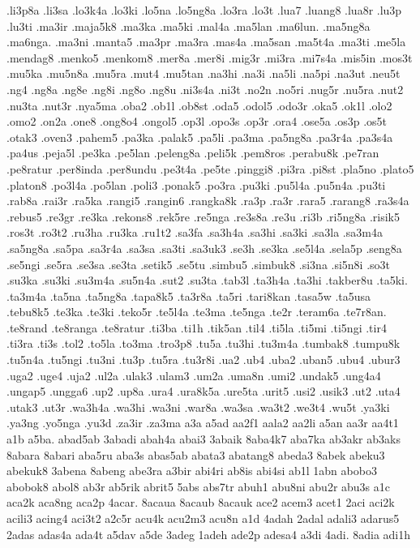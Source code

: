 {.li3p8a .li3sa .lo3k4a .lo3ki .lo5na .lo5ng8a .lo3ra .lo3t .lua7 .luang8
.lua8r .lu3p .lu3ti .ma3ir .maja5k8 .ma3ka .ma5ki .mal4a .ma5lan .ma6lun.
.ma5ng8a .ma6nga. .ma3ni .manta5 .ma3pr .ma3ra .mas4a .ma5san .ma5t4a
.ma3ti .me5la .mendag8 .menko5 .menkom8 .mer8a .mer8i .mig3r .mi3ra
.mi7s4a .mis5in .mos3t .mu5ka .mu5n8a .mu5ra .mut4 .mu5tan .na3hi .na3i
.na5li .na5pi .na3ut .neu5t .ng4 .ng8a .ng8e .ng8i .ng8o .ng8u .ni3s4a
.ni3t .no2n .no5ri .nug5r .nu5ra .nut2 .nu3ta .nut3r .nya5ma .oba2 .ob1l
.ob8st .oda5 .odol5 .odo3r .oka5 .ok1l .olo2 .omo2 .on2a .one8 .ong8o4
.ongol5 .op3l .opo3s .op3r .ora4 .ose5a .os3p .os5t .otak3 .oven3 .pahem5
.pa3ka .palak5 .pa5li .pa3ma .pa5ng8a .pa3r4a .pa3s4a .pa4us .peja5l
.pe3ka .pe5lan .peleng8a .peli5k .pem8ros .perabu8k .pe7ran .pe8ratur
.per8inda .per8undu .pe3t4a .pe5te .pinggi8 .pi3ra .pi8st .pla5no .plato5
.platon8 .po3l4a .po5lan .poli3 .ponak5 .po3ra .pu3ki .pu5l4a .pu5n4a
.pu3ti .rab8a .rai3r .ra5ka .rangi5 .rangin6 .rangka8k .ra3p .ra3r .rara5
.rarang8 .ra3s4a .rebus5 .re3gr .re3ka .rekons8 .rek5re .re5nga .re3s8a
.re3u .ri3b .ri5ng8a .risik5 .ros3t .ro3t2 .ru3ha .ru3ka .ru1t2 .sa3fa
.sa3h4a .sa3hi .sa3ki .sa3la .sa3m4a .sa5ng8a .sa5pa .sa3r4a .sa3sa .sa3ti
.sa3uk3 .se3h .se3ka .se5l4a .sela5p .seng8a .se5ngi .se5ra .se3sa .se3ta
.setik5 .se5tu .simbu5 .simbuk8 .si3na .si5n8i .so3t .su3ka .su3ki .su3m4a
.su5n4a .sut2 .su3ta .tab3l .ta3h4a .ta3hi .takber8u .ta5ki. .ta3m4a
.ta5na .ta5ng8a .tapa8k5 .ta3r8a .ta5ri .tari8kan .tasa5w .ta5usa .tebu8k5
.te3ka .te3ki .teko5r .te5l4a .te3ma .te5nga .te2r .teram6a .te7r8an.
.te8rand .te8ranga .te8ratur .ti3ba .ti1h .tik5an .til4 .ti5la .ti5mi
.ti5ngi .tir4 .ti3ra .ti3s .tol2 .to5la .to3ma .tro3p8 .tu5a .tu3hi
.tu3m4a .tumbak8 .tumpu8k .tu5n4a .tu5ngi .tu3ni .tu3p .tu5ra .tu3r8i .ua2
.ub4 .uba2 .uban5 .ubu4 .ubur3 .uga2 .uge4 .uja2 .ul2a .ulak3 .ulam3 .um2a
.uma8n .umi2 .undak5 .ung4a4 .ungap5 .ungga6 .up2 .up8a .ura4 .ura8k5a
.ure5ta .urit5 .usi2 .usik3 .ut2 .uta4 .utak3 .ut3r .wa3h4a .wa3hi .wa3ni
.war8a .wa3sa .wa3t2 .we3t4 .wu5t .ya3ki .ya3ng .yo5nga .yu3d .za3ir
.za3ma a3a a5ad aa2f1 aala2 aa2li a5an aa3r aa4t1 a1b a5ba. abad5ab 3abadi
abah4a abai3 3abaik 8aba4k7 aba7ka ab3akr ab3aks 8abara 8abari aba5ru
aba3s abas5ab abata3 abatang8 abeda3 8abek abeku3 abekuk8 3abena 8abeng
abe3ra a3bir abi4ri ab8is abi4si ab1l 1abn abobo3 abobok8 abol8 ab3r
ab5rik abrit5 5abs abs7tr abuh1 abu8ni abu2r abu3s a1c aca2k aca8ng aca2p
4acar. 8acaua 8acaub 8acauk ace2 acem3 acet1 2aci aci2k acili3 acing4
aci3t2 a2c5r acu4k acu2m3 acu8n a1d 4adah 2adal adali3 adarus5 2adas
adas4a ada4t a5dav a5de 3adeg 1adeh ade2p adesa4 a3di 4adi. 8adia adi1h
}
